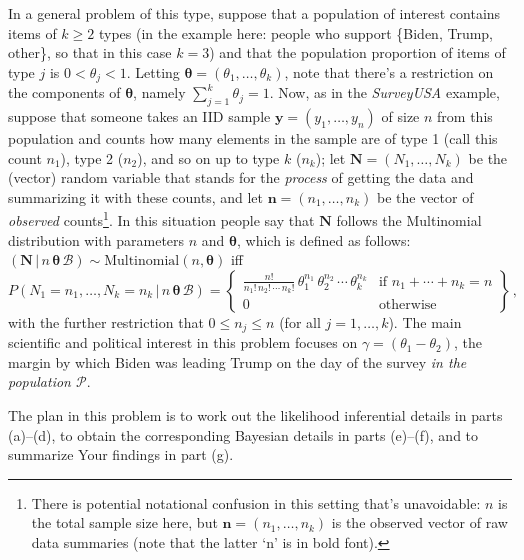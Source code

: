 \documentclass[12pt]{article}
\newcommand{\given}{\, | \,}
\begin{document}
In a general problem of this type, suppose that a population of interest contains items of $k \ge 2$ types (in the example here: people who support \{Biden, Trump, other\}, so that in this case $k = 3$) and that the population proportion of items of type $j$ is $0 < \theta_j < 1$. Letting $\bm{ \theta } = ( \theta_1, \dots, \theta_k )$, note that there's a restriction on the components of $\bm{ \theta }$, namely $\sum_{ j = 1 }^k \theta_j = 1$. Now, as in the \textit{SurveyUSA} example, suppose that someone takes an IID sample $\bm{ y } = ( y_1, \dots, y_n )$ of size $n$ from this population and counts how many elements in the sample are of type 1 (call this count $n_1$), type 2 ($n_2$), and so on up to type $k$ ($n_k$); let $\bm{ N } = ( N_1, \dots, N_k )$ be the (vector) random variable that stands for the \textit{process} of getting the data and summarizing it with these counts, and let $\bm{ n } = ( n_1, \dots, n_k )$ be the vector of \textit{observed} counts\footnote{There is potential notational confusion in this setting that's unavoidable: $n$ is the total sample size here, but $\bm{ n } = ( n_1, \dots, n_k )$ is the observed vector of raw data summaries (note that the latter `n' is in bold font).}. In this situation people say that $\bm{ N }$ follows the Multinomial distribution with parameters $n$ and $\bm{ \theta }$, which is defined as follows:
$( \bm{ N } \given n \, \bm{ \theta } \, \mathcal{ B } ) \sim \textrm{Multinomial} ( n, \bm{ \theta } )$ iff
\begin{equation} \label{e:multinomial-1}
P ( N_1 = n_1, \dots, N_k = n_k \given n \, \bm{ \theta } \, \mathcal{ B } ) = \left\{ \begin{array}{cc} \frac{ n ! }{ n_1 ! \, n_2 ! \, \cdots \, n_k ! } \,  \theta_1^{ n_1 } \, \theta_2^{ n_2 } \, \cdots \, \theta_k^{ n_k } & \textrm{if } n_1 + \cdots + n_k = n \\ 0 & \textrm{otherwise} \end{array} \right\} \, ,
\end{equation}
with the further restriction that $0 \le n_j \le n$ (for all $j = 1, \dots, k$).
The main scientific and political interest in this problem focuses on $\gamma = ( \theta_1 - \theta_2 )$, the margin by which Biden was leading Trump on the day of the survey \textit{in the population $\mathcal{ P }$}. 

The plan in this problem is to work out the likelihood inferential details in parts (a)--(d), to obtain the corresponding Bayesian details in parts (e)--(f), and to summarize Your findings in part (g).
\end{document}
